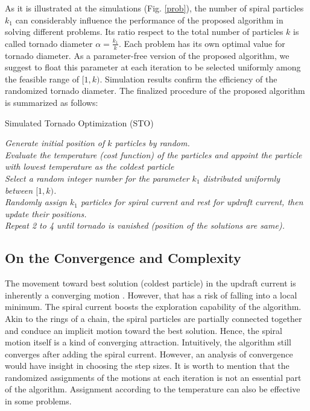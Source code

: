 \documentclass[conference]{IEEEtran}
\begin{document}
As it is illustrated at the simulations (Fig. \ref{prob}), the number of spiral particles $k_1$ can considerably influence the performance of the proposed algorithm in solving different problems. Its ratio respect to the total number of particles $k$ is called tornado diameter $\alpha=\frac{k_1}{k}$. Each problem has its own optimal value for tornado diameter. As a parameter-free version of the proposed algorithm, we suggest to float this parameter at each iteration to be selected uniformly among the feasible range of $[1,k)$. Simulation results confirm the efficiency of the randomized tornado diameter. The finalized procedure of the proposed algorithm is summarized as follows:

\LinesNumbered
\begin{algorithm}
\caption{Simulated Tornado Optimization (STO) \label{alg}}
\emph{Generate initial position of $k$ particles by random.}\\
\emph{Evaluate the temperature (cost function) of the particles and appoint the particle with lowest temperature as the coldest particle}\\
  
\emph{Select a random integer number for the parameter $k_1$ distributed uniformly between $[1,k)$.}\\
\emph{Randomly assign $k_1$ particles for spiral current and rest for updraft current, then update their positions.}\\
\emph{Repeat 2 to 4 until tornado is vanished (position of the solutions are same).}
\end{algorithm}

\subsection{On the Convergence and Complexity}

The movement toward best solution (coldest particle) in the updraft current is inherently a converging motion \cite{Yang15}. However, that has a risk of falling into a local minimum. The spiral current boosts the exploration capability of the algorithm. Akin to the rings of a chain, the spiral particles are partially connected together and conduce an implicit motion toward the best solution. Hence, the spiral motion itself is a kind of converging attraction. Intuitively, the algorithm still converges after adding the spiral current. However, an analysis of convergence would have insight in choosing the step sizes. It is worth to mention that the randomized assignments of the motions at each iteration is not an essential part of the algorithm. Assignment according to the temperature can also be effective in some problems.
\end{document}
